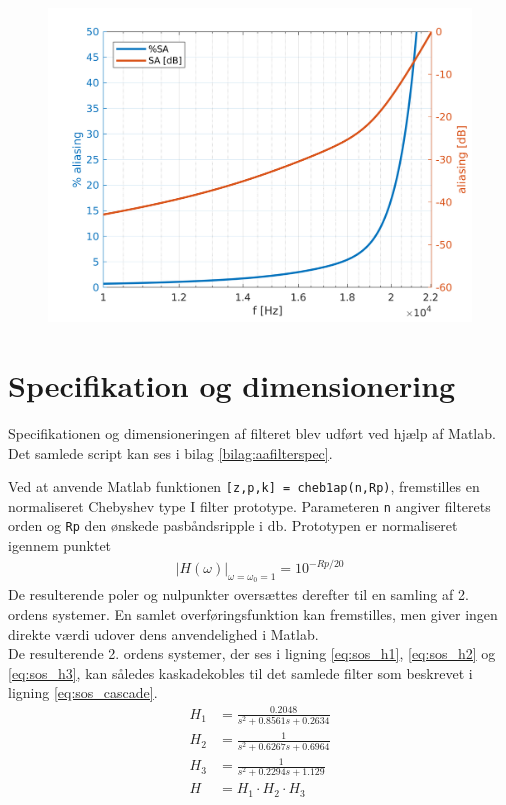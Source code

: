 \begin{figure}[h!]
	\centering
	\includegraphics[width=.8\textwidth]{matlab/filter_sa.png}
	\caption{}
	\label{fig:filter_sa}
\end{figure}


\section{Specifikation og dimensionering}\label{sec:filter_spec}
Specifikationen og dimensioneringen af filteret blev udført ved hjælp af Matlab. Det samlede script kan ses i bilag \ref{bilag:aafilterspec}.

Ved at anvende Matlab funktionen \texttt{[z,p,k] = cheb1ap(n,Rp)}, fremstilles en normaliseret Chebyshev type I filter prototype. 
Parameteren \texttt{n} angiver filterets orden og \texttt{Rp} den ønskede pasbåndsripple i $\si{\decibel}$. 
Prototypen er normaliseret igennem punktet
\begin{align}
 |H(\omega)|_{\omega=\omega_0=1}=10^{-Rp/20}
\end{align}
De resulterende poler og nulpunkter oversættes derefter til en samling af 2. ordens systemer. 
En samlet overføringsfunktion kan fremstilles, men giver ingen direkte værdi udover dens anvendelighed i Matlab.
\\
De resulterende 2. ordens systemer, der ses i ligning \ref{eq:sos_h1}, \ref{eq:sos_h2} og \ref{eq:sos_h3}, kan således kaskadekobles til det samlede filter som beskrevet i ligning \ref{eq:sos_cascade}. 
\begin{align}
H_1 &= \frac{\num{0.2048}}{s^2 + \num{0.8561} s + \num{0.2634}} \label{eq:sos_h1}\\
H_2 &= \frac{\num{1}}{s^2 + \num{0.6267} s + \num{0.6964}} \label{eq:sos_h2}\\
H_3 &= \frac{\num{1}}{s^2 + \num{0.2294} s + \num{1.129}} \label{eq:sos_h3}\\
H &= H_1 \cdot H_2 \cdot H_3 \label{eq:sos_cascade}
\end{align}


